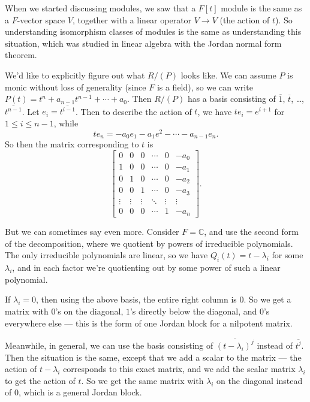 When we started discussing modules, we saw that a $F[t]$ module is the same as a $F$-vector space $V$, together with a linear operator $V \to V$ (the action of $t$). So understanding isomorphism classes of modules is the same as understanding this situation, which was studied in linear algebra with the Jordan normal form theorem. 

We'd like to explicitly figure out what $R/(P)$ looks like. We can assume $P$ is monic without loss of generality (since $F$ is a field), so we can write $P(t) = t^n + a_{n - 1}t^{n - 1} + \cdots + a_0$. Then $R/(P)$ has a basis consisting of $\overline{1}$, $\overline{t}$, \ldots, $\overline{t^{n - 1}}$. Let $e_i = \overline{t^{i - 1}}$. Then to describe the action of $t$, we have $te_i = e^{i + 1}$ for $1 \leq i \leq n - 1$, while \[te_n = -a_0e_1 - a_1e^2 - \cdots - a_{n - 1}e_n.\] So then the matrix corresponding to $t$ is \[\begin{bmatrix} 0 & 0 & 0 & \cdots & 0 & -a_0 \\ 1 & 0 & 0 & \cdots & 0 & -a_1 \\ 0 & 1 & 0 & \cdots & 0 & -a_2 \\ 0 & 0 & 1 & \cdots & 0 & -a_3 \\ \vdots & \vdots & \vdots & \ddots & \vdots & \vdots \\ 0 & 0 & 0 & \cdots & 1 & -a_n\end{bmatrix}.\] 

But we can sometimes say even more. Consider $F = \mathbb{C}$, and use the second form of the decomposition, where we quotient by powers of irreducible polynomials. The only irreducible polynomials are linear, so we have $Q_i(t) = t - \lambda_i$ for some $\lambda_i$, and in each factor we're quotienting out by some power of such a linear polynomial. 

If $\lambda_i = 0$, then using the above basis, the entire right column is $0$. So we get a matrix with $0$'s on the diagonal, $1$'s directly below the diagonal, and $0$'s everywhere else --- this is the form of one Jordan block for a nilpotent matrix.  

Meanwhile, in general, we can use the basis consisting of $\overline{(t - \lambda_i)^j}$ instead of $\overline{t^j}$. Then the situation is the same, except that we add a scalar to the matrix --- the action of $t - \lambda_i$ corresponds to this exact matrix, and we add the scalar matrix $\lambda_i$ to get the action of $t$. So we get the same matrix with $\lambda_i$ on the diagonal instead of $0$, which is a general Jordan block. 

